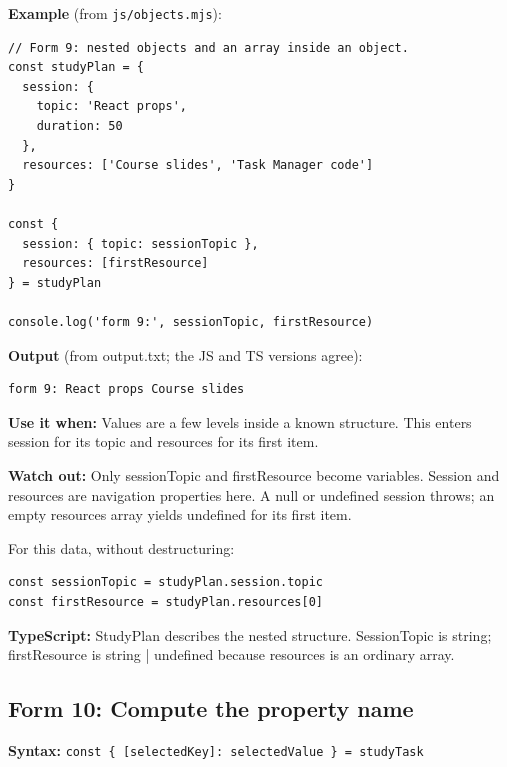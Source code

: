 \documentclass[10pt,a4paper]{article}
\begin{document}

\textbf{Example} (from \texttt{js/\allowbreak{}objects.\allowbreak{}mjs}):

\begin{lstlisting}[language=GuideJS]
// Form 9: nested objects and an array inside an object.
const studyPlan = {
  session: {
    topic: 'React props',
    duration: 50
  },
  resources: ['Course slides', 'Task Manager code']
}

const {
  session: { topic: sessionTopic },
  resources: [firstResource]
} = studyPlan

console.log('form 9:', sessionTopic, firstResource)
\end{lstlisting}


\textbf{Output} (from output.txt; the JS and TS versions agree):

\begin{lstlisting}[language={}]
form 9: React props Course slides
\end{lstlisting}

\textbf{Use it when:} Values are a few levels inside a known structure. This enters session for its topic and resources for its first item.

\textbf{Watch out:} Only sessionTopic and firstResource become variables. Session and resources are navigation properties here. A null or undefined session throws; an empty resources array yields undefined for its first item.


For this data, without destructuring:

\begin{lstlisting}[language=GuideJS]
const sessionTopic = studyPlan.session.topic
const firstResource = studyPlan.resources[0]
\end{lstlisting}

\textbf{TypeScript:} StudyPlan describes the nested structure. SessionTopic is string; firstResource is string | undefined because resources is an ordinary array.

\subsection{Form 10: Compute the property name}

\textbf{Syntax:} \texttt{const \{ [selected\allowbreak{}Key]:\allowbreak{} selected\allowbreak{}Value \} =\allowbreak{} study\allowbreak{}Task}
\end{document}
